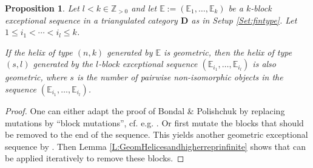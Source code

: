 \documentclass[a4paper,11pt, reqno]{amsart}
\def\E{\mathbb E}
\def\Z{\mathbb Z}
\def\DD{\mathbf D}
\theoremstyle{plain}
\newtheorem{proposition}[dummy]{Proposition}
\theoremstyle{definition}
\numberwithin{equation}{section}
\begin{document}
\begin{proposition}\label{P:dBlockGeometricRed}
        Let $l<k \in \Z_{>0}$ and let $\E:=(\E_1, \ldots, \E_k)$ be a  $k$-block exceptional sequence in a triangulated category $\DD$ as in Setup \ref{Set:fintype}. Let $1\leq i_1 < \cdots < i_l \leq k$.
        
        If the helix of type $(n, k)$ generated by $\E$ is geometric, then  the helix of type $(s, l)$ generated by the $l$-block exceptional sequence $(\E_{i_1}, \ldots, \E_{i_l})$ is also geometric, where $s$ is the number of pairwise non-isomorphic objects in the sequence $(\E_{i_1}, \ldots, \E_{i_l})$.
\end{proposition}
\begin{proof}
One can either adapt the proof of Bondal \& Polishchuk \cite[Prop. 2.6]{bondal-polishchuk} by replacing mutations by ``block mutations'', cf. e.g. \cite{BridgelandStern}. Or first  mutate the blocks that should be removed to the end of the sequence. This yields another geometric exceptional sequence by    \cite[Theorem 5.3.]{BridgelandStern}. Then Lemma \ref{L:GeomHelicesandhigherreprinfinite} shows that \cite[Theorem 2.3]{Hanihara2} can be applied iteratively to remove these blocks.
\end{proof}

 
\end{document}
